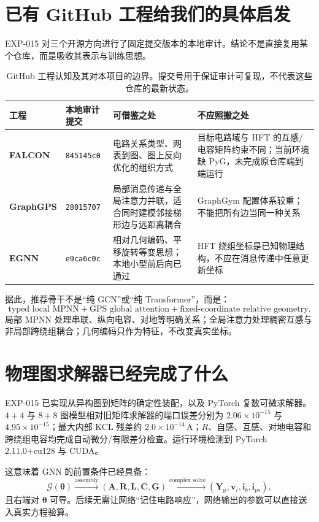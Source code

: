 \documentclass[UTF8,11pt,a4paper]{ctexart}
\newcommand{\Yp}{\bm Y_{\mathrm p}}
\newcommand{\RR}{\bm R}
\newcommand{\LL}{\bm L}
\newcommand{\CC}{\bm C}
\newcommand{\GG}{\bm G}
\newcommand{\Inc}{\bm A}
\newcommand{\vv}{\bm v}
\begin{document}
\section{已有 GitHub 工程给我们的具体启发}

EXP-015 对三个开源方向进行了固定提交版本的本地审计。结论不是直接复用某个仓库，而是吸收其表示与训练思想。

\begin{table}[H]
\centering
\small
\begin{tabularx}{\textwidth}{>{\bfseries}p{2.1cm}p{3.15cm}X X}
\toprule
工程 & 本地审计提交 & 可借鉴之处 & 不应照搬之处\\
\midrule
FALCON & \texttt{845145c0} & 电路关系类型、网表到图、图上反向优化的组织方式 & 目标电路域与 HFT 的互感/电容矩阵约束不同；当前环境缺 PyG，未完成原仓库端到端运行\\
GraphGPS & \texttt{28015707} & 局部消息传递与全局注意力并联，适合同时建模邻接梯形边与远距离耦合 & GraphGym 配置体系较重；不能把所有边当同一种关系\\
EGNN & \texttt{e9ca6c0c} & 相对几何编码、平移旋转等变思想；本地小型前后向已通过 & HFT 绕组坐标是已知物理结构，不应在消息传递中任意更新坐标\\
\bottomrule
\end{tabularx}
\caption{GitHub 工程认知及其对本项目的边界。提交号用于保证审计可复现，不代表这些仓库的最新状态。}
\label{tab:github}
\end{table}

据此，推荐骨干不是“纯 GCN”或“纯 Transformer”，而是：
\begin{equation}
\boxed{\text{typed local MPNN}+\text{GPS global attention}+\text{fixed-coordinate relative geometry}.}
\end{equation}
局部 MPNN 处理串联、纵向电容、对地等明确关系；全局注意力处理稠密互感与非局部跨绕组耦合；几何编码只作为特征，不改变真实坐标。

\section{物理图求解器已经完成了什么}

EXP-015 已实现从异构图到矩阵的确定性装配，以及 PyTorch 复数可微求解器。$4+4$ 与 $8+8$ 图模型相对旧矩阵求解器的端口误差分别为 $2.06\times10^{-15}$ 与 $4.95\times10^{-15}$；最大内部 KCL 残差约 $2.0\times10^{-14}\,\mathrm{A}$；$R$、自感、互感、对地电容和跨绕组电容均完成自动微分/有限差分检查。运行环境检测到 PyTorch 2.11.0+cu128 与 CUDA。

这意味着 GNN 的前置条件已经具备：
\begin{equation}
\mathcal G(\bm\theta)
\xrightarrow{\text{assembly}}
(\Inc,\RR,\LL,\CC,\GG)
\xrightarrow{\text{complex solve}}
(\Yp,\vv_i,\bm i_b,\bm i_{ps}),
\end{equation}
且右端对 $\bm\theta$ 可导。后续无需让网络“记住电路响应”，网络输出的参数可以直接送入真实方程验算。
\end{document}
